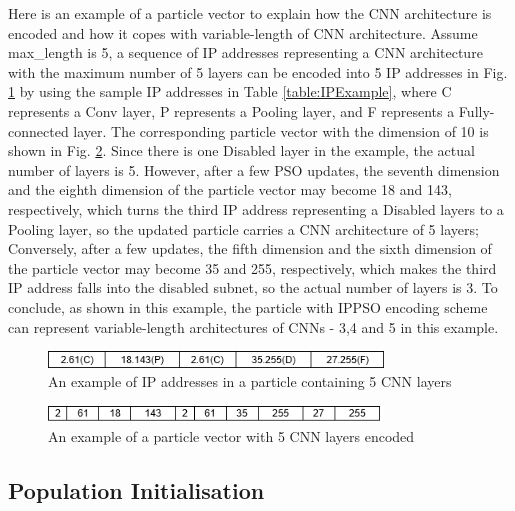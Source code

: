 \documentclass[conference]{IEEEtran}
\begin{document}
Here is an example of a particle vector to explain how the CNN architecture is encoded and how it copes with variable-length of CNN architecture. Assume max\_length is 5, a sequence of IP addresses representing a CNN architecture with the maximum number of 5 layers can be encoded into 5 IP addresses in Fig. \ref{fig:ParticleIP} by using the sample IP addresses in Table \ref{table:IPExample}, where C represents a Conv layer, P represents a Pooling layer, and F represents a Fully-connected layer. The corresponding particle vector with the dimension of 10 is shown in Fig. \ref{fig:ParticleVector}. Since there is one Disabled layer in the example, the actual number of layers is 5. However, after a few PSO updates, the seventh dimension and the eighth dimension of the particle vector may become 18 and 143, respectively, which turns the third IP address representing a Disabled layers to a Pooling layer, so the updated particle carries a CNN architecture of 5 layers; Conversely, after a few updates, the fifth dimension and the sixth dimension of the particle vector may become 35 and 255, respectively, which makes the third IP address falls into the disabled subnet, so the actual number of layers is 3. To conclude, as shown in this example, the particle with IPPSO encoding scheme can represent variable-length architectures of CNNs - 3,4 and 5 in this example. 


\begin{figure}[!t]
	\centering
	\includegraphics[width=3.5in]{ippso-encoding-i}
	\caption{An example of IP addresses in a particle containing 5 CNN layers}
	\label{fig:ParticleIP}
\end{figure}

\begin{figure}[!t]
	\centering
	\includegraphics[width=3.5in]{ippso-encoding-v}
	\caption{An example of a particle vector with 5 CNN layers encoded}
	\label{fig:ParticleVector}
\end{figure}

\subsection{Population Initialisation}
\end{document}
